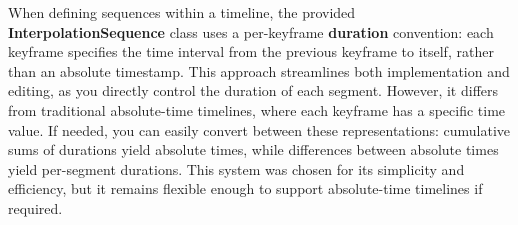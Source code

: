 \pagebreak

\begin{Note}
    When defining sequences within a timeline, the provided \textbf{InterpolationSequence} class uses a per-keyframe \textbf{duration} convention: each keyframe specifies the time interval from the previous keyframe to itself, rather than an absolute timestamp. This approach streamlines both implementation and editing, as you directly control the duration of each segment. However, it differs from traditional absolute-time timelines, where each keyframe has a specific time value. If needed, you can easily convert between these representations: cumulative sums of durations yield absolute times, while differences between absolute times yield per-segment durations. This system was chosen for its simplicity and efficiency, but it remains flexible enough to support absolute-time timelines if required.
\end{Note}

